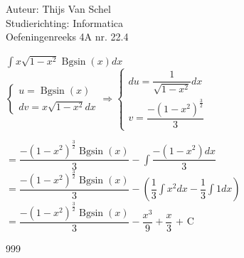 \documentclass[a4paper]{article}
\newcommand{\Bgsin}{\operatorname{Bgsin}}
\begin{document}
  
\noindent \large Auteur: Thijs Van Schel \\
\noindent \large Studierichting: Informatica\\
\noindent \large Oefeningenreeks 4A nr. 22.4\\

\medskip

\normalsize

$\displaystyle\int x\sqrt{1-x^2}\Bgsin(x)dx$\\

$\left\{
   \begin{array}{l}
       u = \Bgsin(x)\\ 			
       dv = x\sqrt{1-x^2}dx
   \end{array}
\right.
\Rightarrow
\left\{
   \begin{array}{l}
       du = \dfrac{1}{\sqrt{1-x^2}}dx\\			
       v = \dfrac{-(1-x^2)^{\tfrac{3}{2}}}{3}
   \end{array}
\right.$

$= \dfrac{-(1-x^2)^{\tfrac{3}{2}}\Bgsin(x)}{3} - \displaystyle\int \dfrac{-(1-x^2)dx}{3}$\\

$= \dfrac{-(1-x^2)^{\tfrac{3}{2}}\Bgsin(x)}{3} - \left(\dfrac{1}{3} \displaystyle\int x^2dx - \dfrac{1}{3} \displaystyle\int 1dx\right)$\\

$= \dfrac{-(1-x^2)^{\tfrac{3}{2}}\Bgsin(x)}{3} - \dfrac{x^3}{9} + \dfrac{x}{3}$ + C\\

\begin{thebibliography}{999}
\end{thebibliography}
\end{document}
